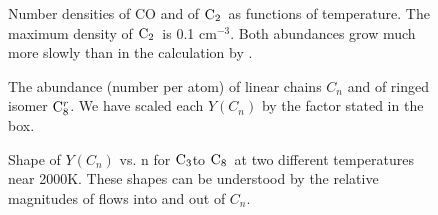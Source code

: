 \documentclass[manuscript]{aastex}
\newcommand{\ctwo}{${\rm C}_2$}
\newcommand{\cthree}{${\rm C}_3$}
\newcommand{\ceight}{${\rm C}_8$}
\newcommand{\ceightr}{${\rm C}_8^r$}
\begin{document}
\clearpage

\begin{figure}
\caption{
Number densities of CO and of \ctwo\ as functions of temperature.
The maximum density of \ctwo\ is 0.1 cm$^{-3}$.
Both abundances grow much more slowly than in the calculation by
\citet{2009ApJ...703..642C}.} \label{fig:ncoc2}
\end{figure}

\clearpage

\begin{figure}
\caption{
The abundance (number per atom) of linear chains $C_n$ and of ringed isomer
\ceightr. We have scaled each $Y(C_n)$ by the factor stated in the box.}
\label{fig:yi}
\end{figure}

\clearpage

\begin{figure}
\caption{
Shape of $Y(C_n)$ vs. n for \cthree to \ceight\ at two different temperatures
near 2000K. These shapes can be understood by the relative magnitudes of
flows into and out of $C_n$.
}
\label{fig:cn}
\end{figure}

\clearpage
\end{document}
